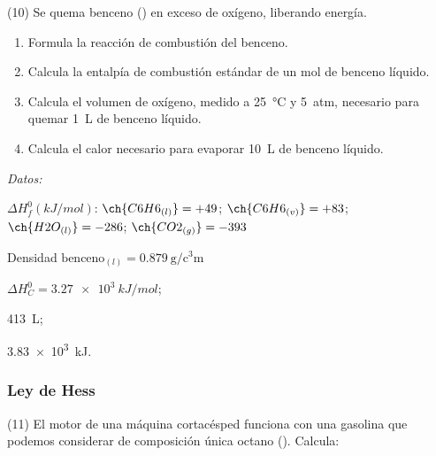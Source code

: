 \documentclass[10pt]{article}
\newenvironment{gexdatos}{
      \vspace{2pt}\noindent\textit{Datos: }
    }{\vspace{5pt}}
\begin{document}
\begin{multicols}{2}
\begin{exercise}[
    tags    = {},
    topics  = {química, termodinámica, termoquímica},
    source  = {FQ 1B MGH 2016, p179, e10},
  ]
  (10) Se quema benceno () en exceso de oxígeno, liberando energía.

  \begin{enumerate}
    \item Formula la reacción de combustión del benceno.
    \item Calcula la entalpía de combustión estándar de un mol de
    benceno líquido.
    \item Calcula el volumen de oxígeno, medido a \SI{25}{\celsius} y \SI{5}{atm}, necesario para quemar \SI{1}{\liter} de benceno líquido.
    \item Calcula el calor necesario para evaporar \SI{10}{\liter} de benceno líquido.
  \end{enumerate}

  \begin{gexdatos}
    \( \Delta H^0_f (\si{kJ/mol}) \):
    \( \ch{C6H6_{(l)}}  = +49 \);
    \( \ch{C6H6_{(v)}}  = +83 \);
    \( \ch{H2O_{(l)}}   = -286 \);
    \( \ch{CO2_{(g)}}   = -393 \)

    Densidad \( \textrm{benceno}_{(l)} = \SI{0.879}{\gram\per\cubic\centi\meter} \)
  \end{gexdatos}
\end{exercise}

\begin{solution}
  \begin{enumerate*}
    \item \( \Delta H^0_C = \SI{3.27e3}{kJ/mol} \); \item \SI{413}{\liter}; \item \SI{3.83e3}{kJ}.
  \end{enumerate*}
\end{solution}





\subsubsection{Ley de Hess}

\begin{exercise}[
    tags    = {},
    topics  = {química, termodinámica, termoquímica},
    source  = {FQ 1B MGH 2016, p180, e11},
  ]
  (11) El motor de una máquina cortacésped funciona con una gasolina que podemos considerar de composición única octano (). Calcula:


\end{exercise}
\end{multicols}
\end{document}
